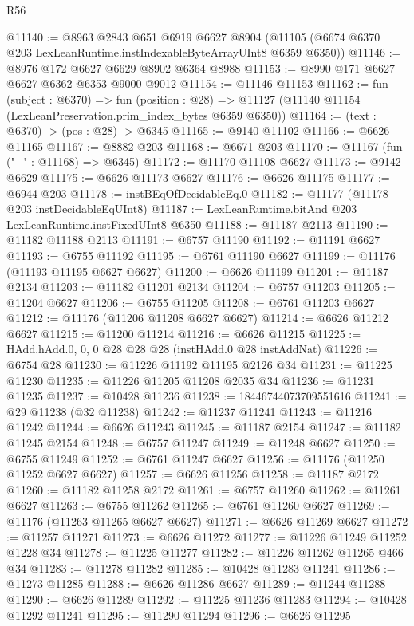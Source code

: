 \begin{lexlean}{R56}
\begin{coremodule}
@11140 := @8963
    @2843
    @651
    @6919
    @6627
    @8904
    (@11105 (@6674 @6370 @203 LexLeanRuntime.instIndexableByteArrayUInt8 @6359 @6350))
@11146 := @8976 @172 @6627 @6629 @8902 @6364 @8988
@11153 := @8990 @171 @6627 @6627 @6362 @6353 @9000 @9012
@11154 := @11146 @11153
@11162 := fun (subject : @6370) =>
  fun (position : @28) => @11127 (@11140 @11154 (LexLeanPreservation.prim_index_bytes @6359 @6350))
@11164 := (text : @6370) -> (pos : @28) -> @6345
@11165 := @9140 @11102
@11166 := @6626 @11165
@11167 := @8882 @203
@11168 := @6671 @203
@11170 := @11167 (fun ("_" : @11168) => @6345)
@11172 := @11170 @11108 @6627
@11173 := @9142 @6629
@11175 := @6626 @11173 @6627
@11176 := @6626 @11175
@11177 := @6944 @203
@11178 := instBEqOfDecidableEq.{0}
@11182 := @11177 (@11178 @203 instDecidableEqUInt8)
@11187 := LexLeanRuntime.bitAnd @203 LexLeanRuntime.instFixedUInt8 @6350
@11188 := @11187 @2113
@11190 := @11182 @11188 @2113
@11191 := @6757 @11190
@11192 := @11191 @6627
@11193 := @6755 @11192
@11195 := @6761 @11190 @6627
@11199 := @11176 (@11193 @11195 @6627 @6627)
@11200 := @6626 @11199
@11201 := @11187 @2134
@11203 := @11182 @11201 @2134
@11204 := @6757 @11203
@11205 := @11204 @6627
@11206 := @6755 @11205
@11208 := @6761 @11203 @6627
@11212 := @11176 (@11206 @11208 @6627 @6627)
@11214 := @6626 @11212 @6627
@11215 := @11200 @11214
@11216 := @6626 @11215
@11225 := HAdd.hAdd.{0, 0, 0} @28 @28 @28 (instHAdd.{0} @28 instAddNat)
@11226 := @6754 @28
@11230 := @11226 @11192 @11195 @2126 @34
@11231 := @11225 @11230
@11235 := @11226 @11205 @11208 @2035 @34
@11236 := @11231 @11235
@11237 := @10428 @11236
@11238 := 18446744073709551616
@11241 := @29 @11238 (@32 @11238)
@11242 := @11237 @11241
@11243 := @11216 @11242
@11244 := @6626 @11243
@11245 := @11187 @2154
@11247 := @11182 @11245 @2154
@11248 := @6757 @11247
@11249 := @11248 @6627
@11250 := @6755 @11249
@11252 := @6761 @11247 @6627
@11256 := @11176 (@11250 @11252 @6627 @6627)
@11257 := @6626 @11256
@11258 := @11187 @2172
@11260 := @11182 @11258 @2172
@11261 := @6757 @11260
@11262 := @11261 @6627
@11263 := @6755 @11262
@11265 := @6761 @11260 @6627
@11269 := @11176 (@11263 @11265 @6627 @6627)
@11271 := @6626 @11269 @6627
@11272 := @11257 @11271
@11273 := @6626 @11272
@11277 := @11226 @11249 @11252 @1228 @34
@11278 := @11225 @11277
@11282 := @11226 @11262 @11265 @466 @34
@11283 := @11278 @11282
@11285 := @10428 @11283 @11241
@11286 := @11273 @11285
@11288 := @6626 @11286 @6627
@11289 := @11244 @11288
@11290 := @6626 @11289
@11292 := @11225 @11236 @11283
@11294 := @10428 @11292 @11241
@11295 := @11290 @11294
@11296 := @6626 @11295

\end{coremodule}
\end{lexlean}
